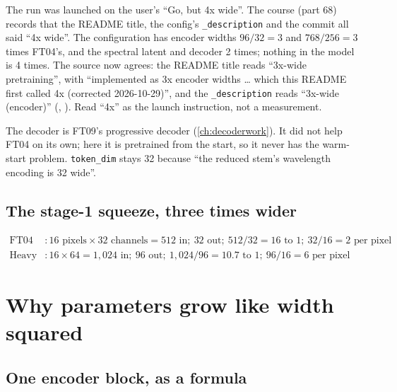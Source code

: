 \begin{sourcenote}
The run was launched on the user's ``Go, but 4x wide''. The course (part 68) records that the README title, the
config's \texttt{\_description} and the commit all said ``4x wide''. The configuration has encoder widths
$96/32=3$ and $768/256=3$ times FT04's, and the spectral latent and decoder 2 times; nothing in the model is 4
times. The source now agrees: the README title reads ``3x-wide pretraining'', with ``implemented as 3x encoder
widths \ldots{} which this README first called 4x (corrected 2026-10-29)'', and the \texttt{\_description} reads
``3x-wide (encoder)'' (,
). Read ``4x'' as the launch instruction, not a measurement.
\end{sourcenote}

The decoder is FT09's progressive decoder (\cref{ch:decoderwork}). It did not help FT04 on its own; here it is
pretrained from the start, so it never has the warm-start problem. \texttt{token\_dim} stays 32 because ``the
reduced stem's wavelength encoding is 32 wide''.

\subsection{The stage-1 squeeze, three times wider}

\begin{align*}
\text{FT04} &: 16\text{ pixels}\times32\text{ channels} = 512 \text{ in};\ 32\text{ out};\ 512/32 = 16\text{ to }1;\ 32/16 = 2\text{ per pixel}\\
\text{Heavy} &: 16\times64 = 1{,}024 \text{ in};\ 96\text{ out};\ 1{,}024/96 = 10.7\text{ to }1;\ 96/16 = 6\text{ per pixel}
\end{align*}

\section{Why parameters grow like width squared}\label{sec:heavy:width}

\subsection{One encoder block, as a formula}

